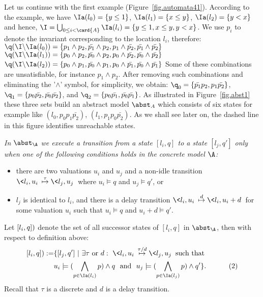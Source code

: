 \documentclass{eptcs}
\begin{document}
\begin{example}
Let us continue with the first example (Figure~\ref{fig.automata41}).
According to the example, we have $\Ia(l_0)=\{y\leq 1\}$,
$\Ia(l_1)=\{x\leq y\}$, $\Ia(l_2)=\{y<x\}$
 and hence, $\I=\bigcup_{0\leq i<
\card{A}} \Ia(l_i)= \{y\leq 1, x\leq y, y<x\}$. 
We use $p_i$ to denote the invariant corresponding to the location $l_i$, therefore:
$\q(\I \backslash\Ia(l_0)) =\{p_1\land p_2, \bar{p_1}\land p_2 , p_1\land
\bar{p_2}, \bar{p_1}\land \bar{p_2}\}  $
$\q(\I \backslash\Ia(l_1)) 
=\{p_0\land p_2, \bar{p_0}\land p_2 , p_0\land \bar{p_2}, \bar{p_0}\land
\bar{p_2}\} $
$ \q(\I \backslash\Ia(l_2))  =\{p_0\land p_1, \bar{p_0}\land p_1
, p_0\land \bar{p_1}, \bar{p_0}\land \bar{p_1}\}$
Some of these combinations are unsatisfiable, for instance $p_1\land p_2$.  
After removing such combinations and eliminating the
'$\land$' symbol, for simplicity, we obtain: $\q_0 =\{\bar{p_1} p_2 , p_1
\bar{p_2}\}$, $\q_1 =\{p_0 \bar{p_2}, \bar{p_0} \bar{p_2}\}$, and $\q_2 =\{p_0
\bar{p_1}, \bar{p_0} \bar{p_1}\}$.
As illustrated in Figure~\ref{fig.abst1} these three sets build an abstract
model $\abst_A$ which consists of six states for example like $(l_0,p_0p_1\bar{p_2})$, 
$(l_1,p_1p_0\bar{p_2})$. As we shall see later
on, the dashed line in this figure identifies unreachable states.
\end{example}



\begin{definition}{\em
In $\abst_\A$ we execute a transition from a state $[l_i,q]$ to a state
$[l_j,q']$ only when one of the following conditions holds in the concrete
model $\A$:
\begin{itemize}
\item there are two valuations $u_i$ and $u_j$ and a non-idle transition $\<
l_i,u_i\> \stackrel{\tau}{\mapsto}\< l_j,u_j\>$ where $u_i\models q$ and
$u_j\models q'$, or
\item $l_j$ is identical to $l_i$, and there is a delay transition $\<
l_i,u_i\> \stackrel{d}{\mapsto}\< l_i,u_i+d\> $ for some valuation $u_i$ such
that $u_i\models q$ and $u_i+d\models q'$.
\end{itemize}}
\end{definition}

\noindent
Let $\next([l_i, q])$ denote the set of all successor states of $[l_i,q]$ in
$\abst_\A$, then with respect to definition above:
\begin{align*}
\next([l_i, q]):= & \{[l_j, q']~|~\exists\tau ~\text{or}~d:~
                  \< l_i,u_i\> \stackrel{\tau / d} {\mapsto}\< l_j,u_j\>
                  \text{ such that } \\
                  & u_i\models (\bigwedge_{p\in\Ia(l_i)}p)\land
                  q \text{ ~and~ } u_j\models (\bigwedge_{p\in\Ia(l_j)}p)
                  \land q'\}. ~\hspace{1cm} (2)
\end{align*}
Recall that $\tau$ is a discrete and $d$ is a delay transition.
\end{document}
